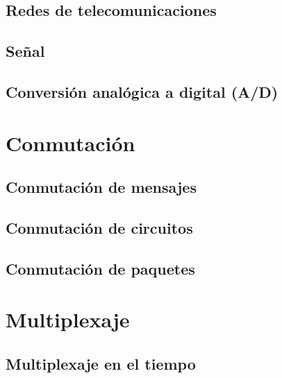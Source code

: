 \documentclass[
]{book}
\begin{document}
\hypertarget{redes-de-telecomunicaciones}{%
\subsection{Redes de telecomunicaciones}\label{redes-de-telecomunicaciones}}

\hypertarget{seuxf1al}{%
\subsection{Señal}\label{seuxf1al}}

\hypertarget{conversiuxf3n-analuxf3gica-a-digital-ad}{%
\subsection{Conversión analógica a digital (A/D)}\label{conversiuxf3n-analuxf3gica-a-digital-ad}}

\hypertarget{conmutaciuxf3n}{%
\section{Conmutación}\label{conmutaciuxf3n}}

\hypertarget{conmutaciuxf3n-de-mensajes}{%
\subsection{Conmutación de mensajes}\label{conmutaciuxf3n-de-mensajes}}

\hypertarget{conmutaciuxf3n-de-circuitos}{%
\subsection{Conmutación de circuitos}\label{conmutaciuxf3n-de-circuitos}}

\hypertarget{conmutaciuxf3n-de-paquetes}{%
\subsection{Conmutación de paquetes}\label{conmutaciuxf3n-de-paquetes}}

\hypertarget{multiplexaje}{%
\section{Multiplexaje}\label{multiplexaje}}

\hypertarget{multiplexaje-en-el-tiempo}{%
\subsection{Multiplexaje en el tiempo}\label{multiplexaje-en-el-tiempo}}
\end{document}
